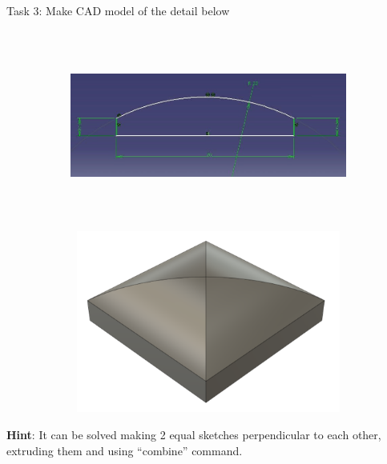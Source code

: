 \documentclass[aspectratio=169]{beamer}
\newcommand{\fbckg}[1]{\usebackgroundtemplate{\texttt{[image: \#1]}}}%
\begin{document}
    \begin{frame}[c]{Task 3: Make CAD model of the detail below}
        \framesubtitle{}
            \vspace{-0.6cm}
            \begin{figure}[H]
                \begin{subfigure}{0.65\textwidth}
                    \centering\includegraphics[height=6cm,width=1\textwidth,keepaspectratio]{resources/task_31.jpg}
                    \label{fig:resources/task_31.jpg}
                \end{subfigure}
                \begin{subfigure}{0.32\textwidth}
                    \centering\includegraphics[height=6cm,width=1\textwidth,keepaspectratio]{resources/task_32.png}
                    \label{fig:resources/task_32.png}
                \end{subfigure}
            \end{figure}
            \textbf{Hint}: It can be solved making 2 equal sketches perpendicular to each other, extruding them and using “combine” command. 

        \end{frame} 

\fbckg{fibeamer/figs/last_page.png}
\frame[plain]{}
\end{document}
